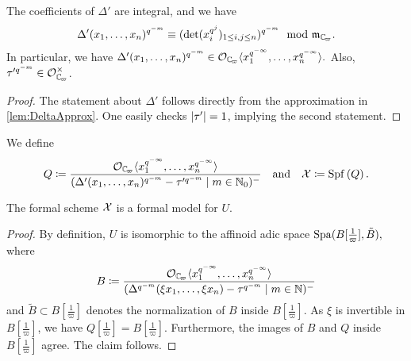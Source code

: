 \documentclass[../main.tex]{subfiles}
\begin{document}
\begin{lem}\label{lem:PropsOfDeltaPrAndTauPr}
  The coefficients of $\Delta'$ are 
  integral, and we have
  \begin{equation*}
    \Delta'(x_1, \dots, x_n)^{q^{-m}} \equiv (\det(x_i^{q^j})_{1 \leq i,j \leq
    n})^{q^{-m}} \mod \fm_\Cp.
  \end{equation*}
  In particular, we have 
  $\Delta'(x_1, \dots, x_n)^{q^{-m}} \in \cO_\Cp \langle x_1^{q^{-\infty}}, \dots
  , x_n^{q^{-\infty}}\rangle.$
  Also, $\tau'^{q^{-m}} \in \cO_\Cp^\times$. 
\begin{proof}
  The statement about $\Delta'$ follows directly from the approximation in 
  \cref{lem:DeltaApprox}. One easily checks $\lvert \tau' \rvert = 1$, implying the second
  statement.
\end{proof}
\end{lem}

We define 
\begin{equation}\label{eq:defQ}
  Q \coloneq \frac
    {\cO_\Cp \langle x_1^{q^{-\infty}}, \dots , x_n^{q^{-\infty}}
      \rangle}
      {(\Delta'(x_1, \dots, x_n)^{q^{-m}} - \tau'^{q^{-m}} \mid m \in \N_0)^-}
      \quad \text{and} \quad
  \cX \coloneq \spf \left( Q \right).
\end{equation}

\begin{prop}\label{prop:AffinoidIsFormalModel}
  The formal scheme $\mathcal{X}$ is a formal model for $U$. 
\end{prop}
\begin{proof} 
  By definition, $U$ is isomorphic to the affinoid adic space $\operatorname{Spa}(B[\tfrac 1\varpi], \tilde B),$ where
  \begin{equation*}
    B \coloneqq \frac{\cO_\Cp \langle x_1^{q^{-\infty}}, \dots,
    x_n^{q^{-\infty}} \rangle}
    {(\Delta^{q^{-m}}(\xi x_1, \dots, \xi x_n) - \tau^{q^{-m}} \mid m \in \N)^-}
  \end{equation*}
  and $\tilde B \subset B[\tfrac 1\varpi]$ denotes the normalization of 
  $B$ inside $B[\tfrac 1 \varpi]$. 
  As $\xi$ is invertible in $B[\tfrac 1 \varpi]$, we have 
  $Q[\tfrac 1 \varpi] = B[\tfrac 1 \varpi]$. Furthermore, the images of 
  $B$ and $Q$ inside $B[\tfrac 1 \varpi]$ agree. The claim follows.
\end{proof}
\end{document}
